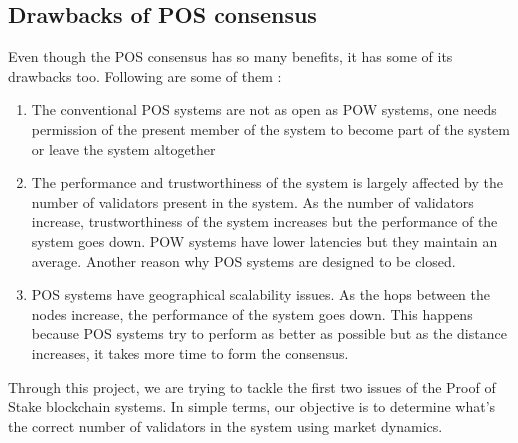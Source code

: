 \subsection{Drawbacks of POS consensus}

Even though the POS consensus has so many benefits, it has some of its drawbacks too. Following are some of them :

\begin{enumerate}
    \item The conventional POS systems are not as open as POW systems, one needs permission of the present member of the system to become part of the system or leave the system altogether
    \item The performance and trustworthiness of the system is largely affected by the number of validators present in the system. As the number of validators increase, trustworthiness of the system increases but the performance of the system goes down. POW systems have lower latencies but they maintain an average. Another reason why POS systems are designed to be closed.
    \item POS systems have geographical scalability issues. As the hops between the nodes increase, the performance of the system goes down. This happens because POS systems try to perform as better as possible but as the distance increases, it takes more time to form the consensus.
\end{enumerate}
Through this project, we are trying to tackle the first two issues of the Proof of Stake blockchain systems. In simple terms, our objective is to determine what's the correct number of validators in the system using market dynamics.
